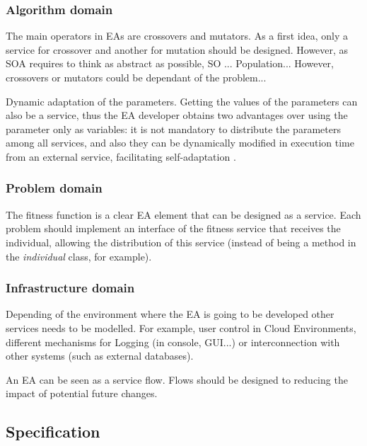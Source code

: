 \subsubsection{Algorithm domain} The main operators in EAs are crossovers and mutators. As a first idea, only a service for crossover and another for mutation should be designed. However, as SOA requires to think as abstract as possible, SO ... Population... However, crossovers or mutators could be dependant of the problem...

Dynamic adaptation of the parameters. Getting the values of the parameters can also be a
  service, %
 thus the EA developer obtains two advantages over using the parameter only as variables: %
it is not mandatory to distribute the parameters among all services,
 and also they can be dynamically modified in execution time from an external service, facilitating self-adaptation \cite{eiben2005shared}.

\subsubsection{Problem domain} The fitness function is a clear EA element that can be designed as a service. Each problem should implement an interface
  of the fitness service that receives the individual, allowing the
  distribution of this service (instead of being a method in the {\em
    individual} class, for example).

\subsubsection{Infrastructure domain} Depending of the environment where the EA is going to be developed other services needs to be modelled. For example, user control in Cloud Environments, different mechanisms for Logging (in console, GUI...) or interconnection with other systems (such as external databases).

 

An EA can be seen as a service flow. Flows should be designed to reducing the impact of potential future changes.

\subsection{Specification}

